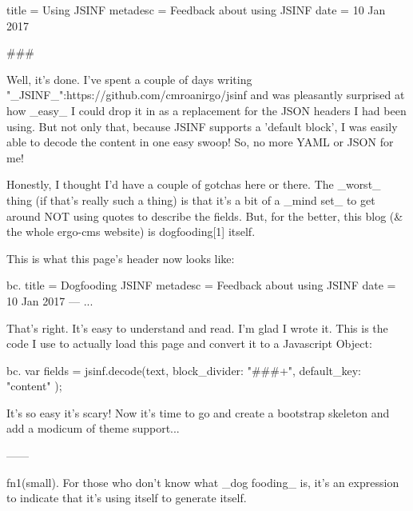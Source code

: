title = Using JSINF
metadesc = Feedback about using JSINF
date = 10 Jan 2017

###

Well, it's done. I've spent a couple of days writing "_JSINF_":https://github.com/cmroanirgo/jsinf and was pleasantly surprised at how _easy_ I could drop it in as a replacement for the JSON headers I had been using. But not only that, because JSINF supports a 'default block', I was easily able to decode the content in one easy swoop! So, no more YAML or JSON for me!

Honestly, I thought I'd have a couple of gotchas here or there. The _worst_ thing (if that's really such a thing) is that it's a bit of a _mind set_ to get around NOT using quotes to describe the fields. But, for the better, this blog (& the whole ergo-cms website) is dogfooding[1] itself.

This is what this page's header now looks like:

bc. title = Dogfooding JSINF
metadesc = Feedback about using JSINF
date = 10 Jan 2017
---
...


That's right. It's easy to understand and read. I'm glad I wrote it. This is the code I use to actually load this page and convert it to a Javascript Object:

bc. var fields = jsinf.decode(text, { 
				block_divider: "\#\#\#+", 
				default_key: "content"
			});

It's so easy it's scary! Now it's time to go and create a bootstrap skeleton and add a modicum of theme support...

------

fn1(small). For those who don't know what _dog fooding_ is, it's an expression to indicate that it's using itself to generate itself.

